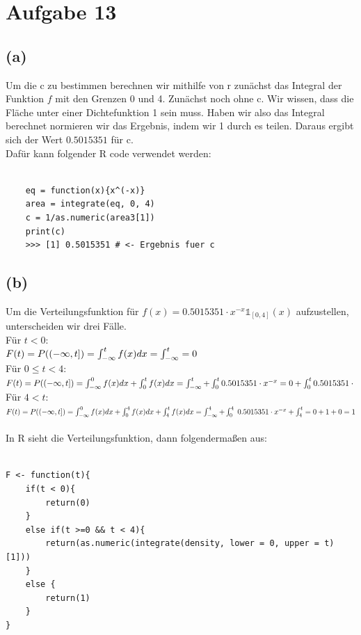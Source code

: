\documentclass[a4paper]{scrartcl}
\begin{document}
\section*{Aufgabe 13}
\subsection*{(a)}
Um die c zu bestimmen berechnen wir mithilfe von r zunächst das Integral der Funktion $f$ mit den Grenzen 0 und 4. Zunächst noch ohne c. Wir wissen, dass die Fläche unter einer Dichtefunktion 1 sein muss. Haben wir also das Integral berechnet normieren wir das Ergebnis, indem wir 1 durch es teilen. Daraus ergibt sich der Wert $0.5015351$ für c.\\
Dafür kann folgender R code verwendet werden:\\
\\
\begin{lstlisting}
	eq = function(x){x^(-x)}
	area = integrate(eq, 0, 4)
	c = 1/as.numeric(area3[1])
	print(c)
	>>> [1] 0.5015351 # <- Ergebnis fuer c
\end{lstlisting}



\subsection*{(b)}
Um die Verteilungsfunktion für $f(x) = 0.5015351 \cdot x^{-x} \mathds{1}_{\left[0,4\right]}(x)$ aufzustellen, unterscheiden wir drei Fälle. \\
Für $t < 0$:\\
$
F(t) = P(\left(-\infty, t  \right]) = \int_{-\infty}^{t}f(x)dx = \int_{-\infty}^{t} = 0\\
$\\
Für $ 0 \leq t < 4$:\\
$
F(t) = P(\left(-\infty, t  \right]) = \int_{-\infty}^{0}f(x)dx + \int_{0}^{t} f(x)dx= \int_{-\infty}^{t}  + \int_{0}^{t}0.5015351 \cdot x^{-x}= 0 + \int_{0}^{t}0.5015351 \cdot\\
$\\
Für $ 4 < t$:\\
$
F(t) = P(\left(-\infty, t  \right]) = \int_{-\infty}^{0}f(x)dx + \int_{0}^{4} f(x)dx + \int_{4}^{t}f(x)dx= \int_{-\infty}^{4}  + \int_{0}^{4}\;0.5015351 \cdot x^{-x} + \int_{4}^{t}= 0 + 1 + 0 = 1\\
$\\
\\
In R sieht die Verteilungsfunktion, dann folgendermaßen aus:\\
\\
\begin{lstlisting}
F <- function(t){
	if(t < 0){
		return(0)
	}
	else if(t >=0 && t < 4){
		return(as.numeric(integrate(density, lower = 0, upper = t)[1]))
	}
	else {
		return(1)
	}
}
\end{lstlisting}
\end{document}
